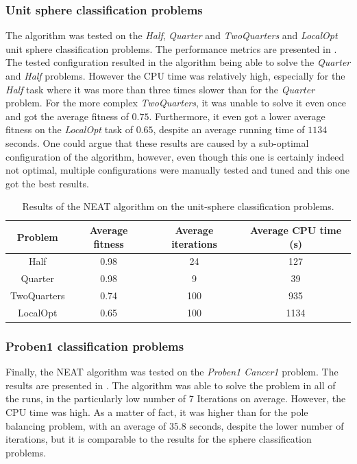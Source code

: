 \subsubsection{Unit sphere classification problems}

The algorithm was tested on the \textit{Half}, \textit{Quarter} and \textit{TwoQuarters} and \textit{LocalOpt} unit sphere classification problems. The performance metrics are presented in .
The tested configuration resulted in the algorithm being able to solve the \textit{Quarter} and \textit{Half} problems. However the CPU time was relatively high, especially for the \textit{Half} task where it was
more than three times slower than for the \textit{Quarter} problem.
For the more complex \textit{TwoQuarters}, it was unable to solve it even once and got the average fitness of $0.75$. Furthermore, it even got a lower average fitness on the \textit{LocalOpt} task of $0.65$, despite an
average running time of $1134$ seconds. One could argue that these results are caused by a sub-optimal configuration of the algorithm, however, even though this one is certainly indeed not optimal, multiple configurations
were manually tested and tuned and this one got the best results.


\begin{table}
    \caption{Results of the NEAT algorithm on the unit-sphere classification problems.}
    \centering
    \label{tab:nneat_sphere}
    \begin{tabular}{ |c|c|c|c| }
        \hline
        Problem & Average fitness & Average iterations & Average CPU time (s) \\
        \hline
        Half & 0.98 & 24 & 127 \\
        \hline
        Quarter & 0.98 & 9 & 39 \\
        \hline
        TwoQuarters & 0.74 & 100 & 935 \\
        \hline
        LocalOpt & 0.65 & 100 & 1134 \\
        \hline\hline
    \end{tabular}
\end{table}

\subsubsection{Proben1 classification problems}

Finally, the NEAT algorithm was tested on the \textit{Proben1 Cancer1} problem. The results are presented in .
The algorithm was able to solve the problem in all of the runs, in the particularly low number of 7 Iterations on average. However, the CPU time was high. As a matter of fact, it was
higher than for the pole balancing problem, with an average of $35.8$ seconds, despite the lower number of iterations, but it is comparable to the results for the sphere classification problems.

